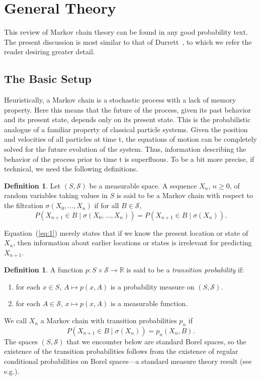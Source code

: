 \documentclass[12pt,letterpaper]{report}
\theoremstyle{plain}
\theoremstyle{definition}
\newtheorem{definition}[theorem]{Definition}
\theoremstyle{remark}
\numberwithin{theorem}{chapter}
\numberwithin{claim}{chapter}
\numberwithin{equation}{chapter}
\numberwithin{conjecture}{chapter}
\renewcommand\S{\ensuremath{\mathcal{S}}}
\newcommand\R{\ensuremath{\mathbb{R}}}
\newcommand\<{\ensuremath{\langle}}
\renewcommand\>{\ensuremath{\rangle}}
\begin{document}
\section{General Theory}
\label{sec:general-theory}
This review of Markov chain theory can be found in any good probability text. The present
discussion is most similar to that of Durrett~\cite{Durret:1996}, to which we
refer the reader desiring greater detail. 

\subsection{The Basic Setup}

Heuristically, a Markov chain is a stochastic process with a lack of memory property. Here
this means that the future of the process, given its past behavior and its present state, depends only
on its present state. This is the probabilistic analogue of a familiar property of classical particle
systems. Given the position and velocities of all particles at time t, the equations of motion can be
completely solved for the future evolution of the system. Thus, information describing the behavior
of the process prior to time t is superﬂuous. To be a bit more precise, if technical, we need the
following definitions.

\begin{definition}
Let $(S, \S)$ be a measurable space. A sequence $X_n$, $n\geq 0$, of random variables
taking values in $S$ is said to be a Markov chain with respect to the filtration 
$\sigma(X_0, \dots, X_{n})$ if for all $B \in \S$,
\begin{equation}
\label{eq:1}
P(X_{n+1} \in B \mid \sigma(X_0, \dots, X_{n}))
=P(X_{n+1} \in B \mid \sigma(X_{n})).
\end{equation}
\end{definition}
Equation~(\ref{eq:1}) merely states that if we know the present location or state of $X_{n}$,
then information about earlier locations or states is irrelevant for predicting $X_{n+1}$.

\begin{definition}
A function $p : S \times \S \rightarrow \R$ is said to be a \emph{transition probability} if:
\begin{enumerate}
\item for each $x \in S$, $A \mapsto p(x, A)$ is a probability measure on $(S, \S)$.
\item for each $A \in \S$, $x \mapsto p(x, A)$ is a measurable function.
\end{enumerate}
\end{definition}
We call $X_n$ a Markov chain with transition probabilities $p_n$ if
\begin{equation}
\label{eq:2.2}
P(X_{n+1} \in B \mid  \sigma(X_n)) = p_n(X_n, B).
\end{equation}
The spaces $(S, \S)$ that we encounter below are standard Borel spaces, so the existence of the
transition probabilities follows from the existence of regular conditional
probabilities on Borel spaces---a standard measure theory result 
(see e.g.\cite{Durret:1996}). %
\end{document}
